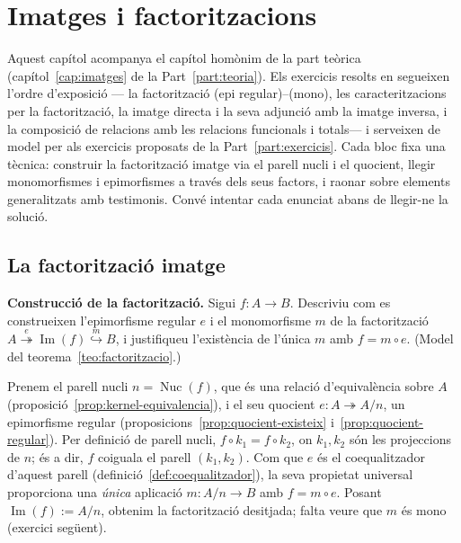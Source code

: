 \chapter{Imatges i factoritzacions}\label{cap:practica-imatges}

Aquest capítol acompanya el capítol homònim de la part teòrica (capítol~\ref{cap:imatges} de la Part~\ref{part:teoria}). Els exercicis resolts en segueixen l'ordre d'exposició --- la factorització (epi regular)--(mono), les caracteritzacions per la factorització, la imatge directa i la seva adjunció amb la imatge inversa, i la composició de relacions amb les relacions funcionals i totals--- i serveixen de model per als exercicis proposats de la Part~\ref{part:exercicis}. Cada bloc fixa una tècnica: construir la factorització imatge via el parell nucli i el quocient, llegir monomorfismes i epimorfismes a través dels seus factors, i raonar sobre elements generalitzats amb testimonis. Convé intentar cada enunciat abans de llegir-ne la solució.

\section{La factorització imatge}\label{prac:factoritzacio}

\begin{exercici}
\textbf{Construcció de la factorització.} Sigui \(f\colon A\to B\). Descriviu com es construeixen l'epimorfisme regular \(e\) i el monomorfisme \(m\) de la factorització \(A\overset{e}{\twoheadrightarrow}\operatorname{Im}(f)\overset{m}{\hookrightarrow}B\), i justifiqueu l'existència de l'única \(m\) amb \(f=m\circ e\). (Model del teorema~\ref{teo:factoritzacio}.)
\end{exercici}
\begin{solucio}
Prenem el parell nucli \(n=\operatorname{Nuc}(f)\), que és una relació d'equivalència sobre \(A\) (proposició~\ref{prop:kernel-equivalencia}), i el seu quocient \(e\colon A\twoheadrightarrow A/n\), un epimorfisme regular (proposicions~\ref{prop:quocient-existeix} i~\ref{prop:quocient-regular}). Per definició de parell nucli, \(f\circ k_1=f\circ k_2\), on \(k_1,k_2\) són les projeccions de \(n\); és a dir, \(f\) coiguala el parell \((k_1,k_2)\). Com que \(e\) és el coequalitzador d'aquest parell (definició~\ref{def:coequalitzador}), la seva propietat universal proporciona una \emph{única} aplicació \(m\colon A/n\to B\) amb \(f=m\circ e\). Posant \(\operatorname{Im}(f):=A/n\), obtenim la factorització desitjada; falta veure que \(m\) és mono (exercici següent).
\end{solucio}

